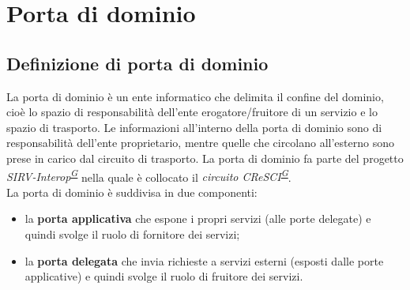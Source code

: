\documentclass[a4paper]{article}
\begin{document}
\newpage

\section{Porta di dominio}

\subsection{Definizione di porta di dominio}
La porta di dominio è un ente informatico che delimita il confine del dominio, cioè lo spazio di responsabilità dell'ente erogatore/fruitore di un servizio e lo spazio di trasporto. Le informazioni all'interno della porta di dominio sono di responsabilità dell'ente proprietario, mentre quelle che circolano all'esterno sono prese in carico dal circuito di trasporto. La porta di dominio fa parte del progetto \textit{SIRV-Interop\textsuperscript{\hyperref[sec:gl]{G}}} nella quale è collocato il \textit{circuito CReSCI\textsuperscript{\hyperref[sec:gl]{G}}}.
\\
La porta di dominio è suddivisa in due componenti:
\begin{itemize}
	\item la \textbf{porta applicativa} che espone i propri servizi (alle porte delegate) e quindi svolge il ruolo di fornitore dei servizi;
    \item la \textbf{porta delegata} che invia richieste a servizi esterni (esposti dalle porte applicative) e quindi svolge il ruolo di fruitore dei servizi.
\end{itemize}
\end{document}
